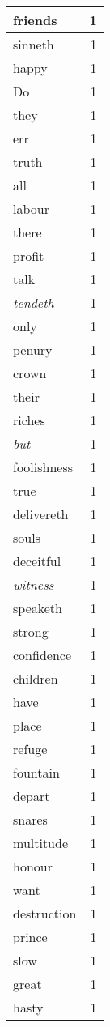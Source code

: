 \begin{center}
\begin{longtable}{l|r}
friends & 1\\ \hline 
sinneth & 1\\ \hline 
happy & 1\\ \hline 
Do & 1\\ \hline 
they & 1\\ \hline 
err & 1\\ \hline 
truth & 1\\ \hline 
all & 1\\ \hline 
labour & 1\\ \hline 
there & 1\\ \hline 
profit & 1\\ \hline 
talk & 1\\ \hline 
\emph{tendeth} & 1\\ \hline 
only & 1\\ \hline 
penury & 1\\ \hline 
crown & 1\\ \hline 
their & 1\\ \hline 
riches & 1\\ \hline 
\emph{but} & 1\\ \hline 
foolishness & 1\\ \hline 
true & 1\\ \hline 
delivereth & 1\\ \hline 
souls & 1\\ \hline 
deceitful & 1\\ \hline 
\emph{witness} & 1\\ \hline 
speaketh & 1\\ \hline 
strong & 1\\ \hline 
confidence & 1\\ \hline 
children & 1\\ \hline 
have & 1\\ \hline 
place & 1\\ \hline 
refuge & 1\\ \hline 
fountain & 1\\ \hline 
depart & 1\\ \hline 
snares & 1\\ \hline 
multitude & 1\\ \hline 
honour & 1\\ \hline 
want & 1\\ \hline 
destruction & 1\\ \hline 
prince & 1\\ \hline 
slow & 1\\ \hline 
great & 1\\ \hline 
hasty & 1\\ \hline 

\end{longtable}
\end{center}
